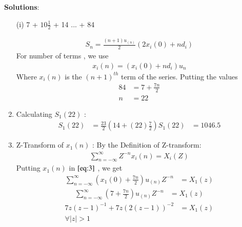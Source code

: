 \documentclass[journal,12pt,twocolumn]{IEEEtran}
\theoremstyle{remark}
\begin{document}
\vspace{0.5cm}
\textbf{Solutions}:
\begin{enumerate}
\item[(i)]   
7 + $10\frac{1}{2}$ + 14 ... + 84
\vspace{0.2cm}

\begin{align}
{S_n} = \frac{(n+1)u_{(n)}}{2}(2x_i(0) + nd_i)\label{eq:1}
\end{align}
For number of terms , we use
\begin{align}
x_i(n) = (x_i(0) + nd_i)u_n\label{eq:2}
\end{align}
Where $x_i(n)$ is the $(n+1)^{th}$ term of the series. Putting the values
\begin{align}  
84 &= 7+\frac{7n}{2}\\
n &= 22
\end{align}
\item 
Calculating $S_1(22)$ : 
\begin{align}
    S_1{(22)} &= \frac{23}{2}(14+(22)\frac{7}{2})
    S_1{(22)} &= 1046.5
    \end{align} 
    \vspace{0.1cm}

\vspace{0.05cm}
\item 
Z-Transform of $x_1(n)$ :
\vspace{0.2cm}
By the Definition of Z-transform:
\begin{align}
 \sum_{n=-\infty}^{\infty} Z^{-n}x_i(n) = X_i(Z)\label{eq:3}
 \end{align}
\vspace{0.05cm}Putting $x_1(n)$ in $\eqref{eq:3}$ , we get \vspace{0.05cm}
\begin{align}
     \sum_{n=-\infty}^{\infty}(x_1(0) + \frac{7n}{2})u_{(n)}Z^{-n} &= X_1(z)
\end{align}
\begin{align}
\sum_{n=-\infty}^{\infty}(7 + \frac{7n}{2})u_{(n)}Z^{-n} &= X_1(z)
\end{align}
\begin{align}
7z(z-1)^{-1}+
7z(2(z-1))^{-2} &= X_1(z) \label{eq:4}\\
\forall \lvert z \rvert  >  1 
\end{align}
    

\end{enumerate}
\end{document}
